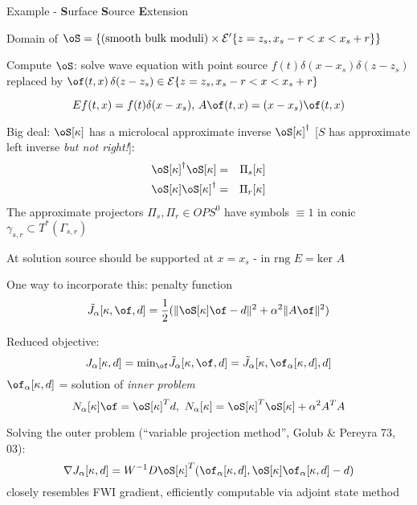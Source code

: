 Example - {\bf S}urface {\bf S}ource {\bf E}xtension 

Domain of $\oS = \{\mbox{(smooth bulk moduli)} \times {\cal E}'\{z=z_s, x_s-r < x < x_s+r\} \}$

Compute $\oS$: solve wave equation with point source {\color{blue} $f(t)\delta(x-x_s)$}$\delta(z-z_s)$ replaced by {\color{blue}$\of(t,x)$}$\delta(z-z_s) \in {\cal E}\{z=z_s, x_s-r < x < x_s+r\}$

\begin{equation}
\label{eqn:extann}
Ef(t,x) = f(t)\delta(x-x_s),\,A\of(t,x)=(x-x_s)\of(t,x)
\end{equation}

Big deal: $\oS[\kappa]$ has a microlocal approximate inverse $\oS[\kappa]^{\dagger}$ [$S$ has approximate left inverse {\em but not right!}]:
\begin{eqnarray}
\oS[\kappa]^{\dagger}\oS[\kappa] &=& \Pi_s[\kappa]\\
\oS[\kappa]\oS[\kappa]^{\dagger} &=& \Pi_r[\kappa]
\end{eqnarray}
The approximate projectors $\Pi_s,\Pi_r \in OPS^0$ have symbols $\equiv 1$ in conic $\gamma_{s,r} \subset T^*(\Gamma_{s,r})$


At solution source should be supported at $x=x_s$ - in $\mbox{rng }E = \mbox{ker }A$

One way to incorporate this: penalty function
\begin{equation}
\label{eqn:Jnaive}
\tilde{J}_{\alpha}[\kappa,\of,d] = \frac{1}{2}(\|\oS[\kappa]\of -d\|^2 + \alpha^2 \|A\of\|^2)
\end{equation}

Reduced objective:
\[
J_{\alpha}[\kappa,d] = \mbox{min}_{\of} \tilde{J}_{\alpha}[\kappa,\of,d] = \tilde{J}_{\alpha}[\kappa,\of_{\alpha}[\kappa,d],d]
\]
$\of_{\alpha}[\kappa,d]$ = solution of {\em inner problem}
\[
N_{\alpha}[\kappa]\of = \oS[\kappa]^Td,\,\,N_{\alpha}[\kappa] = \oS[\kappa]^T\oS[\kappa] + \alpha^2 A^TA
\]

Solving the outer problem (``variable projection method'', Golub \& Pereyra 73, 03):
\[
\nabla J_{\alpha}[\kappa,d] = W^{-1} D\oS[\kappa]^T(\of_{\alpha}[\kappa,d],\oS[\kappa]\of_{\alpha}[\kappa,d]-d)
\]
closely resembles FWI gradient, efficiently computable via adjoint state method

